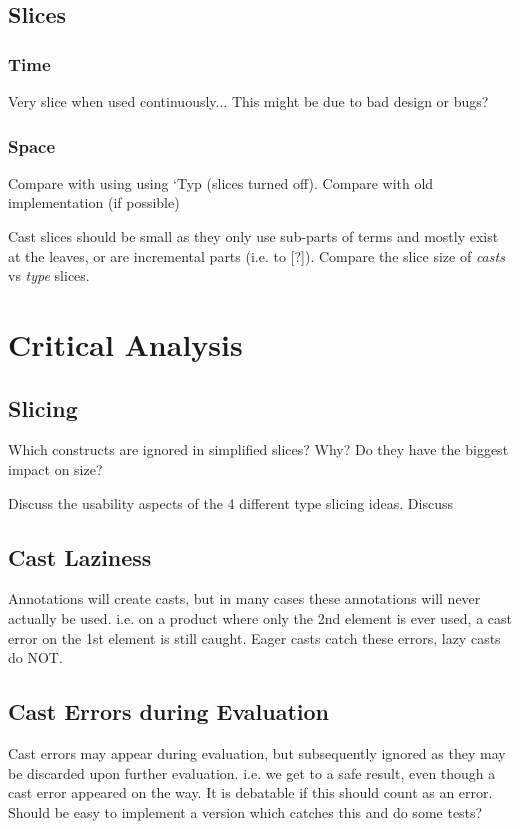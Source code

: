 \subsection{Slices}
\subsubsection{Time}
Very slice when used continuously... This might be due to bad design or bugs?
\subsubsection{Space}
Compare with using using `Typ (slices turned off). Compare with old implementation (if possible)

Cast slices should be small as they only use sub-parts of terms and mostly exist at the leaves, or are incremental parts (i.e. to [?]). Compare the slice size of \textit{casts} vs \textit{type} slices.

\section{Critical Analysis}\label{sec:CriticalAnalysis}
\subsection{Slicing}
Which constructs are ignored in simplified slices? Why? Do they have the biggest impact on size?

Discuss the usability aspects of the 4 different type slicing ideas. Discuss 
\subsection{Cast Laziness}
Annotations will create casts, but in many cases these annotations will never actually be used. i.e. on a product where only the 2nd element is ever used, a cast error on the 1st element is still caught. Eager casts catch these errors, lazy casts do NOT.

\subsection{Cast Errors during Evaluation}
Cast errors may appear during evaluation, but subsequently ignored as they may be discarded upon further evaluation. i.e. we get to a safe result, even though a cast error appeared on the way. It is debatable if this should count as an error. Should be easy to implement a version which catches this and do some tests?
  
